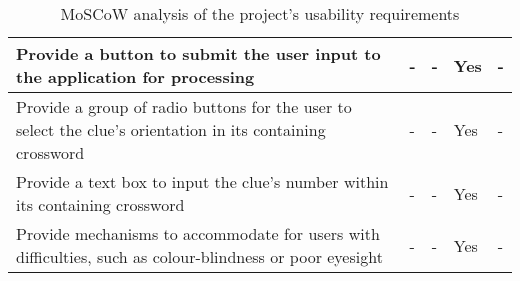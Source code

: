 \begin{table}[H]
\begin{tabular}{|p{9.3cm}|p{1.3cm}|p{1.3cm}|p{1.3cm}|p{1.3cm}|}
    Provide a button to submit the user input to the application for processing &
  - & - & Yes & - \\ \hline

  Provide a group of radio buttons for the user to select the clue's orientation in its containing crossword &
  - & - & Yes & - \\ \hline

    Provide a text box to input the clue's number within its containing crossword &
  - & - & Yes & - \\ \hline

  Provide mechanisms to accommodate for users with difficulties, such as colour-blindness or poor eyesight &
  - & - & Yes & - \\ \hline

    \end{tabular}
    \caption {MoSCoW analysis of the project's usability requirements}
\end{table}